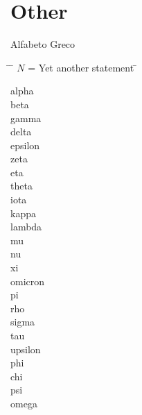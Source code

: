 \documentclass[../formulario.tex]{subfiles}
\begin{document}
\section{Other}
Alfabeto Greco

\begin{multicols}{3}
\begin{tabbing}
\hspace{2em} \= \hspace{3em} \= $N$ = Yet another statement \= \kill

\textAlpha    \>  \textalpha    \>  alpha    \\
\textBeta     \>  \textbeta     \>  beta     \\
\textGamma    \>  \textgamma    \>  gamma    \\
\textDelta    \>  \textdelta    \>  delta    \\
\textEpsilon  \>  \textepsilon  \straightepsilon  \>  epsilon  \\
\textZeta     \>  \textzeta     \>  zeta     \\
\textEta      \>  \texteta      \>  eta      \\
\textTheta    \>  \texttheta  \straighttheta   \>  theta    \\
\textIota     \>  \textiota     \>  iota     \\
\textKappa    \>  \textkappa    \>  kappa    \\
\textLambda   \>  \textlambda   \>  lambda   \\
\textMu       \>  \textmu       \>  mu       \\
\textNu       \>  \textnu       \>  nu       \\
\textXi       \>  \textxi       \>  xi       \\
\textOmikron  \>  \textomikron  \>  omicron  \\
\textPi       \>  \textpi       \>  pi       \\
\textRho      \>  \textrho      \>  rho      \\
\textSigma    \>  \textsigma    \>  sigma    \\
\textTau      \>  \texttau      \>  tau      \\
\textUpsilon  \>  \textupsilon  \>  upsilon  \\
\textPhi      \>  \textphi  \straightphi    \>  phi      \\
\textChi      \>  \textchi      \>  chi      \\
\textPsi      \>  \textpsi      \>  psi      \\
\textOmega    \>  \textomega    \>  omega    \\

\end{tabbing}
\end{multicols}
\end{document}
